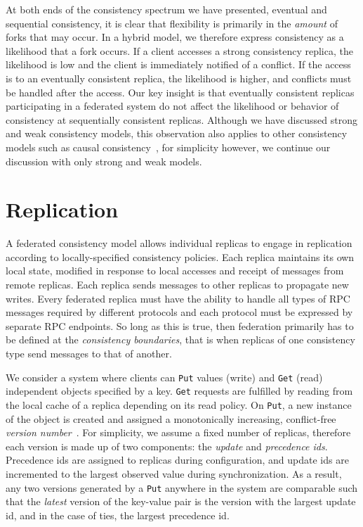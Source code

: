 At both ends of the consistency spectrum we have presented, eventual and sequential consistency, it is clear that flexibility is primarily in the \emph{amount} of forks that may occur.
In a hybrid model, we therefore express consistency as a likelihood that a fork occurs.
If a client accesses a strong consistency replica, the likelihood is low and the client is immediately notified of a conflict.
If the access is to an eventually consistent replica, the likelihood is higher, and conflicts must be handled after the access.
Our key insight is that eventually consistent replicas participating in a federated system do not affect the likelihood or behavior of consistency at sequentially consistent replicas.
Although we have discussed strong and weak consistency models, this observation also applies to other consistency models such as causal consistency~\cite{causal,causal_2,cops,bailis_bolt-causal_2013}, for simplicity however, we continue our discussion with only strong and weak models.

\section{Replication}
\label{ch04_replication}

A federated consistency model allows individual replicas to engage in replication according to locally-specified consistency policies.
Each replica maintains its own local state, modified in response to local accesses and receipt of messages from remote replicas.
Each replica sends messages to other replicas to propagate new writes.
Every federated replica must have the ability to handle all types of RPC messages required by different protocols and each protocol must be expressed by separate RPC endpoints.
So long as this is true, then federation primarily has to be defined at the \emph{consistency boundaries}, that is when replicas of one consistency type send messages to that of another.

We consider a system where clients can \texttt{Put} values (write) and \texttt{Get} (read) independent objects specified by a key.
\texttt{Get} requests are fulfilled by reading from the local cache of a replica depending on its read policy.
On \texttt{Put}, a new instance of the object is created and assigned a monotonically increasing, conflict-free \textit{version
number}~\cite{version_conflict_detection,version_vectors}.
For simplicity, we assume a fixed number of replicas, therefore each version is made up of two components: the \textit{update} and \textit{precedence ids}.
Precedence ids are assigned to replicas during configuration, and update ids are incremented to the largest observed value during synchronization.
As a result, any two versions generated by a \texttt{Put} anywhere in the system are comparable such that the \textit{latest} version of the key-value pair is the version with the largest update id, and in the case of ties, the largest precedence id.

